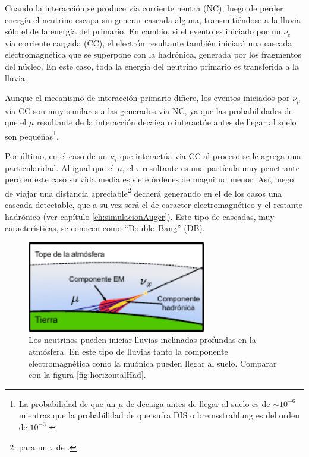 Cuando la interacci\'on se produce via corriente neutra (NC), luego de perder energía el neutrino escapa sin generar cascada alguna, transmiti\'endose a la lluvia sólo el  de la energía del primario.
En cambio, si el evento es iniciado por un $\nu_e$ via corriente cargada (CC), el electrón resultante tambi\'en iniciar\'a una cascada electromagnética que se superpone con la hadrónica, generada por los fragmentos del núcleo.
En este caso, toda la energía del neutrino primario es transferida a la lluvia.

Aunque el mecanismo de interacci\'on primario difiere, los eventos iniciados por $\nu_{\mu}$ via CC son muy similares a las generados via NC, ya que las probabilidades de que el $\mu$ resultante de la interacción decaiga o interactúe antes de llegar al suelo son pequeñas\footnote{La probabilidad de que un $\mu$ de  decaiga antes de llegar al suelo es de $\sim10^{-6}$ mientras que la probabilidad de que sufra DIS o bremsstrahlung es del orden de $10^{-3}$ \cite{cite:tesisJavier}}.

Por \'ultimo, en el caso de un $\nu_{\tau}$ que interactúa via CC al proceso se le agrega una particularidad.
Al igual que el $\mu$, el $\tau$ resultante es una partícula muy penetrante pero en este caso su vida media es siete \'ordenes de magnitud menor.
As\'i, luego de viajar una distancia apreciable\footnote{ para un $\tau$ de .} decaerá generando en el  de los casos una cascada detectable, que a su vez será el  de caracter electromagnético y el  restante hadrónico (ver cap\'itulo \ref{ch:simulacionAuger}).
Este tipo de cascadas, muy características, se conocen como ``Double--Bang'' (DB).
%
\begin{figure}[h!]
\begin{center}
\includegraphics[width=0.7\textwidth]{fig/EASAuger/horizontal_deep_english.pdf}
\caption{Los neutrinos pueden iniciar lluvias inclinadas profundas en la atmósfera.
En este tipo de lluvias tanto la componente electromagnética como la muónica pueden llegar al suelo.
Comparar con la figura \ref{fig:horizontalHad}.
}
\label{fig:horizontalNu}
\end{center}
\end{figure}

